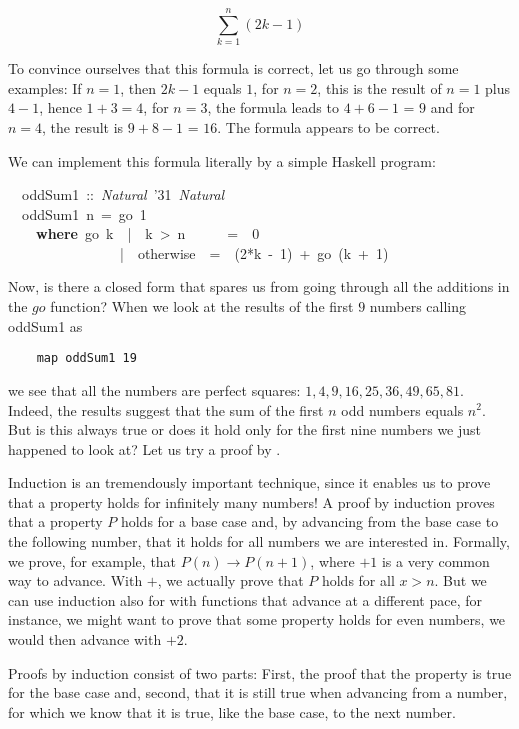 \documentclass{scrreprt}
\newcommand{\texfamily}{\fontfamily{cmtex}\selectfont}
\begin{document}
\[ 
\sum_{k=1}^{n}{(2k - 1)}
\] 

To convince ourselves that this formula is correct,
let us go through some examples:
If $n=1$, then $2k - 1$ equals $1$,
for $n=2$, this is the result of $n = 1$
plus $4 - 1$, hence $1 + 3 = 4$,
for $n=3$, the formula leads to $4 + 6 - 1$ = $9$
and for $n=4$, the result is $9 + 8 - 1$ = $16$.
The formula appears to be correct.

We can implement this formula literally 
by a simple Haskell program:
\begin{tabbing}\texfamily
~~oddSum1~::~{\itshape Natural}~\char'31~{\itshape Natural}\\
\texfamily ~~oddSum1~n~=~go~1\\
\texfamily ~~~~{\bfseries where}~go~k~~|~~k~>~n~~~~~~=~~0~\\
\texfamily ~~~~~~~~~~~~~~~~|~~otherwise~~=~~(2*k~-~1)~+~go~(k~+~1)
\end{tabbing}

Now, is there a closed form that spares us
from going through all the additions in the $go$ function?
When we look at the results of the first $9$ numbers
calling oddSum1 as  

\begin{tabbing}\tt
~~~map~oddSum1~19
\end{tabbing}

we see that all the numbers are perfect squares:
$1, 4, 9, 16, 25, 36, 49, 65, 81$.
Indeed, the results suggest that
the sum of the first $n$ odd numbers equals $n^2$.
But is this always true
or does it hold only for the first
nine numbers we just happened to look at?
Let us try a proof by .

Induction is an tremendously important technique,
since it enables us to prove that a property holds
for infinitely many numbers!
A proof by induction proves that a property $P$
holds for a base case and,
by advancing from the base case to the following number,
that it holds for all numbers we are interested in.
Formally, we prove, for example, that
$P(n) \rightarrow P(n+1)$,
where $+1$ is a very common way to advance.
With $+$, we actually prove that $P$ holds for all $x > n$.
But we can use induction also for 
with functions that advance at a different pace,
for instance, we might want to prove
that some property holds for even numbers,
we would then advance with $+2$.

Proofs by induction consist
of two parts:
First, the proof that the property 
is true for the base case
and, second, that it is still true when advancing
from a number, for which we know that it is true,
like the base case, to the next number.
\end{document}

